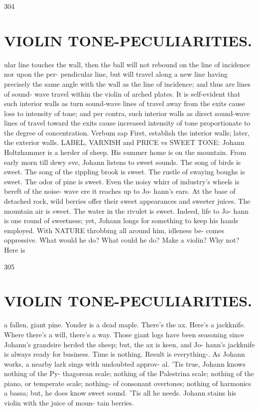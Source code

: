 \documentclass{article}
\begin{document}
304

\section*{VIOLIN TONE-PECULIARITIES.}
ular line touches the wall, then the ball will not rebound on the line of incidence nor upon the per- pendicular line, but will travel along a new line having precisely the same angle with the wall as the line of incidence; and thus are lines of sound- wave travel within the violin of arched plates. It is self-evident that such interior walls as turn sound-wave lines of travel away from the exits cause loss to intensity of tone; and per contra, such interior walls as direct sound-wave lines of travel toward the exits cause increased intensity of tone proportionate to the degree of concentration. Verbum sap First, establish the interior walls; later, the exterior walls. LABEL, VARNISH and PRICE vs SWEET TONE: Johann Holtzhammer is a herder of sheep. His summer home is on the mountain. From early morn till dewy eve, Johann listens to sweet sounds. The song of birds is sweet. The song of the rippling brook is sweet. The rustle of swaying boughs is sweet. The odor of pine is sweet. Even the noisy whirr of industry's wheels is bereft of the noise- wave ere it reaches up to Jo- hann's ears. At the base of detached rock, wild berries offer their sweet appearances and sweeter juices. The mountain air is sweet. The water in the rivulet is sweet. Indeed, life to Jo- hann is one round of sweetness; yet, Johann longs for something to keep his hands employed. With NATURE throbbing all around him, idleness be- comes oppressive. What would he do? What could he do? Make a violin? Why not? Here is

305

\section*{VIOLIN TONE-PECULIARITIES.}
a fallen, giant pine. Yonder is a dead maple. There's the ax. Here's a jackknife. Where there's a will, there's a way. Those giant logs have been seasoning since Johann's grandsire herded the sheep; but, the ax is keen, and Jo- hann's jackknife is always ready for business. Time is nothing. Result is everything-. As Johann works, a nearby lark sings with undoubted approv- al. 'Tis true, Johann knows nothing of the Py- thagorean scale; nothing of the Palestrina scale; nothing of the piano, or temperate scale; nothing- of consonant overtones; nothing of harmonics a bassa; but, he does know sweet sound. 'Tis all he needs. Johann stains his violin with the juice of moun- tain berries.
\end{document}
